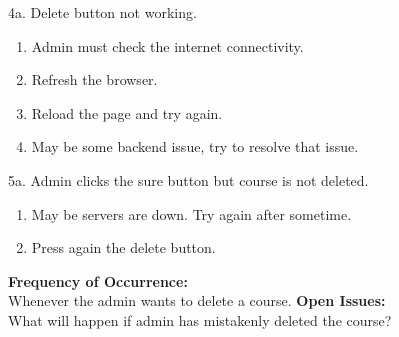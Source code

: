 4a. Delete button not working.
\begin{enumerate}
\item Admin must check the internet connectivity.
\item Refresh the browser.
\item Reload the page and try again.
\item May be some backend issue, try to resolve that issue.
\end{enumerate}
5a. Admin clicks the sure button but course is not deleted.
\begin{enumerate}
\item May be servers are down. Try again after sometime.
\item Press again the delete button.
\end{enumerate}
\textbf{Frequency of Occurrence:}\\
Whenever the admin wants to delete a course.
\textbf{Open Issues:}\\
What will happen if admin has mistakenly deleted the course?



